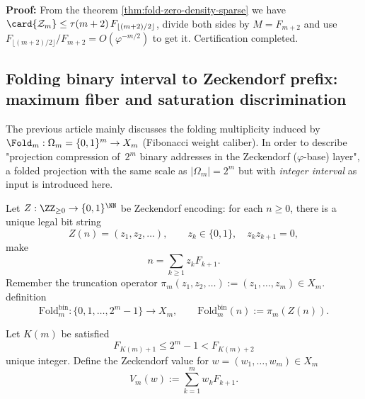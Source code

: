 \textbf{Proof:}
From the theorem \ref{thm:fold-zero-density-sparse} we have \(\card{\mathcal{Z}_m}\le \tau(m+2)\,F_{\lfloor (m+2)/2\rfloor}\), divide both sides by \(M=F_{m+2}\) and use \(F_{\lfloor (m+2)/2\rfloor}/F_{m+2}=O(\varphi^{-m/2})\) to get it. Certification completed.



\subsection{Folding binary interval to Zeckendorf prefix: maximum fiber and saturation discrimination}\label{app:fold-binary-prefix}

The previous article mainly discusses the folding multiplicity induced by \(\Fold_m:\Omega_m=\{0,1\}^m\to X_m\) (Fibonacci weight caliber).
In order to describe "projection compression of \(\,2^m\) binary addresses in the Zeckendorf (\(\varphi\)-base) layer", a folded projection with the same scale as \(|\Omega_m|=2^m\) but with \emph{integer interval} as input is introduced here.

\begin{definition}\label{def:fold-bin}
Let \(Z:\ZZ_{\ge 0}\to\{0,1\}^{\NN}\) be Zeckendorf encoding: for each \(n\ge 0\), there is a unique legal bit string
\[
Z(n)=(z_1,z_2,\dots),\qquad z_k\in\{0,1\},\quad z_k z_{k+1}=0,
\]
make
\[
n=\sum_{k\ge 1} z_k F_{k+1}.
\]
Remember the truncation operator \(\pi_m(z_1,z_2,\dots):=(z_1,\dots,z_m)\in X_m\). definition
\[
\mathrm{Fold}^{\mathrm{bin}}_m:\{0,1,\dots,2^m-1\}\to X_m,\qquad
\mathrm{Fold}^{\mathrm{bin}}_m(n):=\pi_m(Z(n)).
\]
\end{definition}

\begin{definition}\label{def:K-of-m}
Let \(K(m)\) be satisfied
\begin{equation}\label{eq:K-of-m}
F_{K(m)+1}\le 2^m-1 < F_{K(m)+2}
\end{equation}
unique integer. Define the Zeckendorf value for \(w=(w_1,\dots,w_m)\in X_m\)
\[
V_m(w):=\sum_{k=1}^m w_k F_{k+1}.
\]
\end{definition}

